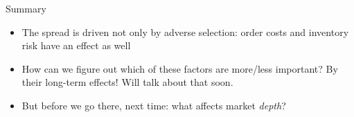 \documentclass[english,10pt
,aspectratio=169
]{beamer}
\begin{document}
%




\begin{frame}{Summary}
	\begin{itemize}
		\item The spread is driven not only by adverse selection: order costs and inventory risk have an effect as well
		\item How can we figure out which of these factors are more/less important? By their long-term effects! Will talk about that soon.
		\item But before we go there, next time: what affects market \emph{depth}?
	\end{itemize}
\end{frame}
\end{document}
